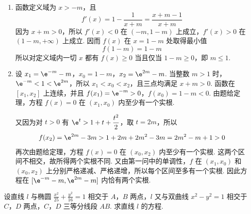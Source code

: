 \begin{solution}
\begin{enumerate}
\item 函数定义域为 \(x>-m\)，且
\[
f'(x)=1-\frac{1}{x+m}=\frac{x+m-1}{x+m}
\]
因为 \(x+m>0\)，所以 \(f'(x)<0\) 在 \((-m,1-m)\) 上成立，\(f'(x)>0\) 在 \((1-m,+\infty)\) 上成立. 因而 \(f(x)\) 在 \(x=1-m\) 处取得最小值
\[
f(1-m)=1-m
\]
所以对定义域内一切 \(x\) 都有 \(f(x)\geqslant0\) 当且仅当 \(1-m\geqslant0\)，即 \(m\leqslant1\).

\item 设 \(x_1=\e^{-m}-m\)，\(x_0=1-m\)，\(x_2=\e^{2m}-m\). 当整数 \(m>1\) 时，\(\e^{-m}<1<\e^{2m}\)，所以 \(x_1<x_0<x_2\)，且三点均满足 \(x+m>0\). 函数在 \([x_1,x_2]\) 上连续，并且
\(f(x_1)=\e^{-m}>0\)，\(f(x_0)=1-m<0\).
由题给定理，方程 \(f(x)=0\) 在 \((x_1,x_0)\) 内至少有一个实根.

又因为对 \(t>0\) 有 \(\e^t>1+t+\dfrac{t^2}{2}\)，取 \(t=2m\)，所以
\[
f(x_2)=\e^{2m}-3m>1+2m+2m^2-3m=2m^2-m+1>0
\]
再次由题给定理，方程 \(f(x)=0\) 在 \((x_0,x_2)\) 内至少有一个实根. 这两个区间不相交，故所得两个实根不同. 又由第一问中的单调性，\(f\) 在 \((x_1,x_0)\) 和 \((x_0,x_2)\) 上分别严格递减、严格递增，所以每个区间至多有一个实根. 因此方程在 \([\e^{-m}-m,\e^{2m}-m]\) 内恰有两个实根.
\end{enumerate}
\end{solution}

\begin{problem}
设直线 \(l\) 与椭圆 \(\frac{x^2}{25} + \frac{y^2}{16} = 1\) 相交于 \(A\)，\(B\) 两点，\(l\) 又与双曲线 \(x^{2} - y^{2} = 1\) 相交于 \(C\)，\(D\) 两点，\(C\)，\(D\) 三等分线段 \(AB\). 求直线 \(l\) 的方程.
\end{problem}

